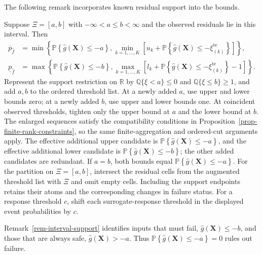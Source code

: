 \documentclass[review,11pt,3p,authoryear,nopreprintline]{elsarticle}
\begin{document}
The following remark incorporates known residual support into the bounds.

\begin{remark}
  \label{rem-interval-support}
  Suppose $\Xi=[a,b]$ with $-\infty<a\le b<\infty$ and the observed residuals lie in this interval. Then
  \begin{align*}
    \overline p_{\hat f}
      &=\min\left\{\mathbb P\left\{\hat g(\bm X)\le-a\right\},
        \min_{k=1,\ldots,K}\left[u_k+\mathbb P\left\{\hat g(\bm X)\le-\xi_{(k)}^{\mathrm{te}}\right\}\right]\right\},\\
    \underline p_{\hat f}
      &=\max\left\{\mathbb P\left\{\hat g(\bm X)\le-b\right\},
        \max_{k=1,\ldots,K}\left[l_k+\mathbb P\left\{\hat g(\bm X)\le-\xi_{(k)}^{\mathrm{te}}\right\}-1\right]\right\}.
  \end{align*}
  Represent the support restriction on $\mathbb R$ by $\mathbb Q\{\xi<a\}\le0$ and $\mathbb Q\{\xi\le b\}\ge1$, and add $a,b$ to the ordered threshold list. At a newly added $a$, use upper and lower bounds zero; at a newly added $b$, use upper and lower bounds one. At coincident observed thresholds, tighten only the upper bound at $a$ and the lower bound at $b$. The enlarged sequences satisfy the compatibility conditions in Proposition~\ref{prop-finite-rank-constraints}, so the same finite-aggregation and ordered-cut arguments apply. The effective additional upper candidate is $\mathbb P\left\{\hat g(\bm X)\le-a\right\}$, and the effective additional lower candidate is $\mathbb P\left\{\hat g(\bm X)\le-b\right\}$; the other added candidates are redundant. If $a=b$, both bounds equal $\mathbb P\left\{\hat g(\bm X)\le-a\right\}$. For the partition on $\Xi=[a,b]$, intersect the residual cells from the augmented threshold list with $\Xi$ and omit empty cells. Including the support endpoints retains their atoms and the corresponding changes in failure status. For a response threshold $c$, shift each surrogate-response threshold in the displayed event probabilities by $c$.
\end{remark}

Remark~\ref{rem-interval-support} identifies inputs that must fail, $\hat g(\bm X)\le-b$, and those that are always safe, $\hat g(\bm X)>-a$. Thus $\mathbb P\left\{\hat g(\bm X)\le-a\right\}=0$ rules out failure.

\end{document}
